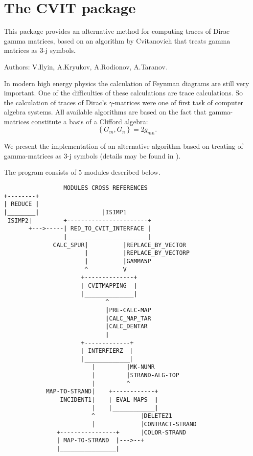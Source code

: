 
\newpage

\section{The CVIT package}
\label{sec:CVIT}
This package provides an alternative method for computing traces of Dirac
gamma matrices, based on an algorithm by Cvitanovich that treats gamma
matrices as 3-j symbols.

Authors: V.Ilyin, A.Kryukov, A.Rodionov, A.Taranov.

In modern high energy physics the calculation of Feynman diagrams are
still very important. One of the difficulties of these calculations
are trace calculations. So the calculation of traces of Dirac's
$\gamma$-matrices were one of first task of computer algebra systems.
All available algorithms are based on the fact that gamma-matrices
constitute a basis of a Clifford algebra:
\[
  \left\{G_{m},G_{n}\right\} = 2g_{mn}.
\]

We present the implementation of an alternative algorithm based on
treating of gamma-matrices as 3-j symbols (details may be found in
\cite{Ilyin:89,Kennedy:1982}).

The program consists of 5 modules described below.

\newpage
\begin{verbatim}
                 MODULES CROSS REFERENCES
+--------+
| REDUCE |
|________|                  |ISIMP1
 ISIMP2|         +-----------------------+
       +--->-----| RED_TO_CVIT_INTERFACE |
                 |_______________________|
              CALC_SPUR|          |REPLACE_BY_VECTOR
                       |          |REPLACE_BY_VECTORP
                       |          |GAMMA5P
                       ^          V
                      +--------------+
                      | CVITMAPPING  |
                      |______________|
                             ^
                             |PRE-CALC-MAP
                             |CALC_MAP_TAR
                             |CALC_DENTAR
                             |
                      +-------------+
                      | INTERFIERZ  |
                      |_____________|
                         |         |MK-NUMR
                         |         |STRAND-ALG-TOP
                         |         ^
            MAP-TO-STRAND|    +------------+
                INCIDENT1|    | EVAL-MAPS  |
                         |    |____________|
                         ^             |DELETEZ1
                         |             |CONTRACT-STRAND
               +----------------+      |COLOR-STRAND
               | MAP-TO-STRAND  |--->--+
               |________________|
\end{verbatim}


